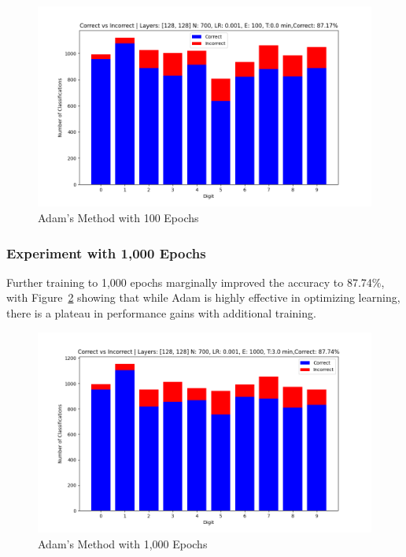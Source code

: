 \documentclass{article}
\begin{document}
\begin{figure}[h!]
    \centering
    \includegraphics[scale=0.5]{../figs/Adam_100ep.png}
    \caption{Adam's Method with 100 Epochs}
    \label{fig:Adam_100ep}
\end{figure}

\subsubsection{Experiment with 1,000 Epochs}
Further training to 1,000 epochs marginally improved the accuracy to 87.74\%, with Figure~\ref{fig:Adam_1000ep} showing that while Adam is highly effective in optimizing learning, there is a plateau in performance gains with additional training.

\newpage

\begin{figure}[h!]
    \centering
    \includegraphics[scale=0.5]{../figs/Adam_1000ep.png}
    \caption{Adam's Method with 1,000 Epochs}
    \label{fig:Adam_1000ep}
\end{figure}
\end{document}
